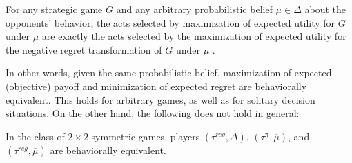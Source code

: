 \documentclass[fleqn,reqno,11pt]{article}
\begin{document}
\begin{fact} \label{fact:maxEU-minReg} For any strategic game $G$ and any arbitrary
  probabilistic belief $\mu \in \Delta$ about the opponents' behavior, the acts
  selected by maximization of expected utility for $G$ under $\mu$ are exactly the acts
  selected by the maximization of expected utility for the negative regret transformation of $G$
  under $\mu$ \citep[e.g.,][]{HalpernPass2012:Iterated-Regret}.
\end{fact}

\noindent In other words, given the same probabilistic belief, maximization of expected
(objective) payoff and minimization of expected regret are behaviorally
equivalent. This holds for arbitrary games, as well as for solitary decision situations. On the
other hand, the following does not hold in general:

\begin{fact} \label{fact:equivalence2x2}
In the class of $2 \times 2$ symmetric games, players $(\tau^{reg}, \Delta)$, $(\tau^{\pi}, \overline{\mu})$, and $(\tau^{reg},\overline{\mu})$ are behaviorally equivalent.
\end{fact} 
\end{document}
